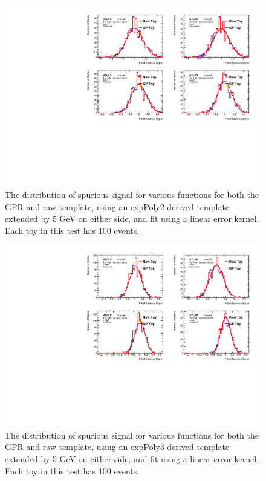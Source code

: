 \begin{figure} 
\begin{center}
  \includegraphics[width=\textwidth]{figures/background/gpr/validation/linear/ToyTest_FitSigVals_lowpT_100_noSig}   
\caption{The distribution of spurious signal for various functions for both the GPR and raw template, using an expPoly2-derived template extended by 5 GeV on either side, and fit using a linear error kernel. Each toy in this test has 100 events.}
\label{fig:linearkernel_lowpt_100_noSig}
\end{center}
\end{figure}

\begin{figure} 
\begin{center}
  \includegraphics[width=\textwidth]{figures/background/gpr/validation/linear/ToyTest_FitSigVals_medpT_100_noSig}   
\caption{The distribution of spurious signal for various functions for both the GPR and raw template, using an expPoly3-derived template extended by 5 GeV on either side, and fit using a linear error kernel. Each toy in this test has 100 events.}
\label{fig:linearkernel_medpt_100_noSig}
\end{center}
\end{figure}

